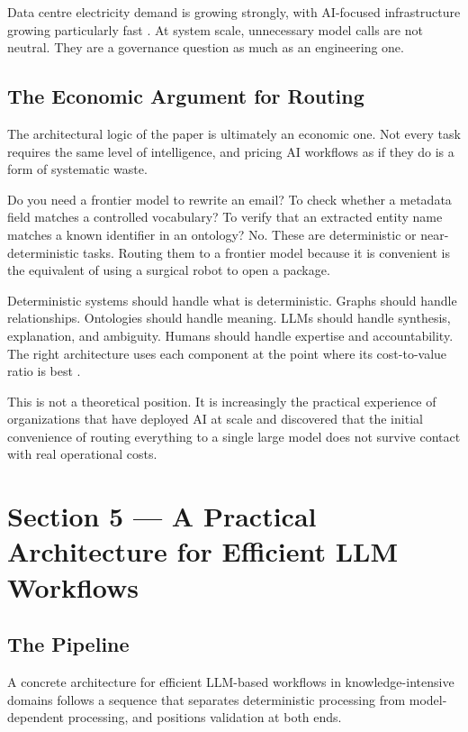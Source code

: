 \documentclass[man,12pt,donotrepeattitle]{apa7}
\begin{document}
Data centre electricity demand is growing strongly, with AI-focused
infrastructure growing particularly fast \parencite{noffsinger2025}. At
system scale, unnecessary model calls are not neutral. They are a governance
question as much as an engineering one.

\subsection{The Economic Argument for Routing}

The architectural logic of the paper is ultimately an economic one. Not
every task requires the same level of intelligence, and pricing AI workflows
as if they do is a form of systematic waste.

Do you need a frontier model to rewrite an email? To check whether a
metadata field matches a controlled vocabulary? To verify that an extracted
entity name matches a known identifier in an ontology? No. These are
deterministic or near-deterministic tasks. Routing them to a frontier model
because it is convenient is the equivalent of using a surgical robot to open
a package.

Deterministic systems should handle what is deterministic. Graphs should
handle relationships. Ontologies should handle meaning. LLMs should handle
synthesis, explanation, and ambiguity. Humans should handle expertise and
accountability. The right architecture uses each component at the point
where its cost-to-value ratio is best \parencite{ma2025,wilhelm2025}.

This is not a theoretical position. It is increasingly the practical
experience of organizations that have deployed AI at scale and discovered
that the initial convenience of routing everything to a single large model
does not survive contact with real operational costs.


\section{Section 5 --- A Practical Architecture for Efficient LLM Workflows}

\subsection{The Pipeline}

A concrete architecture for efficient LLM-based workflows in
knowledge-intensive domains follows a sequence that separates deterministic
processing from model-dependent processing, and positions validation at both
ends.
\end{document}

